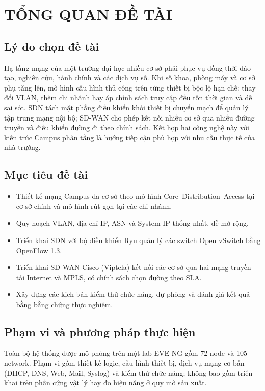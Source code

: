 \section{TỔNG QUAN ĐỀ TÀI}\label{sec:tong_quan}

\subsection{Lý do chọn đề tài}

Hạ tầng mạng của một trường đại học nhiều cơ sở phải phục vụ đồng thời đào tạo, nghiên cứu, hành chính và các dịch vụ số. Khi số khoa, phòng máy và cơ sở phụ tăng lên, mô hình cấu hình thủ công trên từng thiết bị bộc lộ hạn chế: thay đổi VLAN, thêm chi nhánh hay áp chính sách truy cập đều tốn thời gian và dễ sai sót. SDN tách mặt phẳng điều khiển khỏi thiết bị chuyển mạch để quản lý tập trung mạng nội bộ; SD-WAN cho phép kết nối nhiều cơ sở qua nhiều đường truyền và điều khiển đường đi theo chính sách. Kết hợp hai công nghệ này với kiến trúc Campus phân tầng là hướng tiếp cận phù hợp với nhu cầu thực tế của nhà trường.

\subsection{Mục tiêu đề tài}

\begin{itemize}
    \item Thiết kế mạng Campus đa cơ sở theo mô hình Core--Distribution--Access tại cơ sở chính và mô hình rút gọn tại các chi nhánh.
    \item Quy hoạch VLAN, địa chỉ IP, ASN và System-IP thống nhất, dễ mở rộng.
    \item Triển khai SDN với bộ điều khiển Ryu quản lý các switch Open vSwitch bằng OpenFlow 1.3.
    \item Triển khai SD-WAN Cisco (Viptela) kết nối các cơ sở qua hai mạng truyền tải Internet và MPLS, có chính sách chọn đường theo SLA.
    \item Xây dựng các kịch bản kiểm thử chức năng, dự phòng và đánh giá kết quả bằng bằng chứng thực nghiệm.
\end{itemize}

\subsection{Phạm vi và phương pháp thực hiện}

Toàn bộ hệ thống được mô phỏng trên một lab EVE-NG gồm 72 node và 105 network. Phạm vi gồm thiết kế logic, cấu hình thiết bị, dịch vụ mạng cơ bản (DHCP, DNS, Web, Mail, Syslog) và kiểm thử chức năng; không bao gồm triển khai trên phần cứng vật lý hay đo hiệu năng ở quy mô sản xuất.

